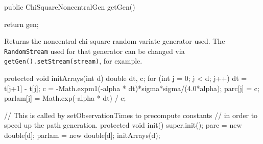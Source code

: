 \begin{code}

   public ChiSquareNoncentralGen getGen() \begin{hide} { return gen; }\end{hide}
\end{code}
\begin{tabb}
Returns the noncentral chi-square random variate generator used.
The \texttt{RandomStream} used for that generator can be changed via
\texttt{getGen().setStream(stream)}, for example.
\end{tabb}
\begin{code} \begin{hide}

   protected void initArrays(int d) {
      double dt, c;
      for (int j = 0; j < d; j++) {
         dt = t[j+1] - t[j];
         c = -Math.expm1(-alpha * dt)*sigma*sigma/(4.0*alpha);
         parc[j] = c;
         parlam[j] = Math.exp(-alpha * dt) / c;
      }
   }

   // This is called by setObservationTimes to precompute constants
   // in order to speed up the path generation.
   protected void init() {
       super.init();
       parc = new double[d];
       parlam = new double[d];
       initArrays(d);
    }\end{hide}
\end{code}
\begin{code}\begin{hide}
} \end{hide}
\end{code}
